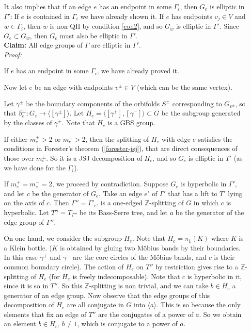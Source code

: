 \documentclass[12pt]{amsart}
\newcommand{\Z}{\mathbb{Z}}
\begin{document}
It also implies that if an edge $e$ has an endpoint in some $\Gamma_i$, then $G_e$ is elliptic in $\Gamma'$: If $e$ is contained in $\Gamma_i$ we have already shown it. If $e$ has endpoints $v_j\in V$ and $w\in\Gamma_i$, then $w$ is non-QH by condition \ref{con2}, and so $G_w$ is elliptic in $\Gamma'$. Since $G_e\subset G_w$, then $G_e$ must also be elliptic in $\Gamma'$.\\

{\bf Claim:} All edge groups of $\Gamma$ are elliptic in $\Gamma'$.\\

{\em Proof:}

If $e$ has an endpoint in some $\Gamma_i$, we have already proved it.

Now let $e$ be an edge with endpoints $v^{\pm}\in V$ (which can be the same vertex). 

Let $\gamma^{\pm}$ be the boundary components of the orbifolds $S^{\pm}$ corresponding to $G_{v^{\pm}}$, so that $\partial^{\pm}_e:G_e \to \langle [\gamma^{\pm}]\rangle$. Let $H_e = \langle [\gamma^+],[\gamma^-] \rangle \subset G$ be the subgroup generated by the classes of $\gamma^{\pm}$. Note that $H_e$ is a GBS group.

If either $m_e^+>2$ or $m_e^->2$, then the splitting of $H_e$ with edge $e$ satisfies the conditions in Forester's theorem (\ref{forester-jsj}), that are direct consequences of those over $m_e^{\pm}$. So it is a JSJ decomposition of $H_e$, and so $G_e$ is elliptic in $T'$ (as we have done for the $\Gamma_i$). 

If $m_e^+=m_e^-=2$, we proceed by contradiction. Suppose $G_e$ is hyperbolic in $\Gamma'$, and let $c$ be the generator of $G_e$. Take an edge $e'$ of $\Gamma'$ that has a lift to $T'$ lying on the axis of $c$. Then $\Gamma''=\Gamma'_{e'}$ is a one-edged $\Z$-splitting of $G$ in which $c$ is hyperbolic. Let $T''=T_{\Gamma''}$ be its Bass-Serre tree, and let $a$ be the generator of the edge group of $\Gamma''$.

On one hand, we consider the subgroup $H_e$. Note that $H_e=\pi_1(K)$ where $K$ is a Klein bottle. ($K$ is obtained by gluing two M\"obius bands by their boundaries. In this case $\gamma^+$ and $\gamma^-$ are the core circles of the M\"obius bands, and $c$ is their common boundary circle). The action of $H_e$ on $T''$ by restriction gives rise to a $\Z$-splitting of $H_e$ (for $H_e$ is freely indecomposable). Note that $c$ is hyperbolic in it, since it is so in $T''$. So this $\Z$-splitting is non trivial, and we can take $b\in H_e$ a generator of an edge group. Now observe that the edge groups of this decomposition of $H_e$ are all conjugate in $G$ into $\langle a\rangle$. This is so because the only elements that fix an edge of $T''$ are the conjugates of a power of $a$. So we obtain an element $b\in H_e$, $b\neq 1$, which is conjugate to a power of $a$.
\end{document}
